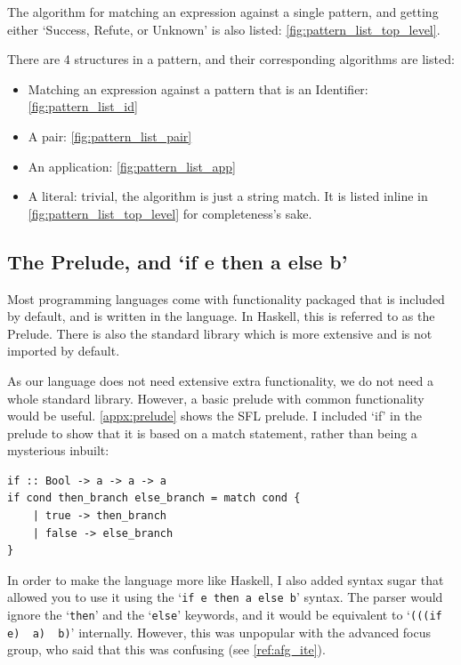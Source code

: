 The algorithm for matching an expression against a single pattern, and getting either `Success, Refute, or Unknown' is also listed: \ref{fig:pattern_list_top_level}. 

There are 4 structures in a pattern, and their corresponding algorithms are listed: 
\begin{itemize}
    \item Matching an expression against a pattern that is an Identifier: \ref{fig:pattern_list_id}
    \item A pair: \ref{fig:pattern_list_pair}
    \item An application: \ref{fig:pattern_list_app}
    \item A literal: trivial, the algorithm is just a string match. It is listed inline in \ref{fig:pattern_list_top_level} for completeness's sake. 
\end{itemize}

\subsection{The Prelude, and `if e then a else b'}
Most programming languages come with functionality packaged that is included by default, and is written in the language. In Haskell, this is referred to as the Prelude. There is also the standard library which is more extensive and is not imported by default. 

As our language does not need extensive extra functionality, we do not need a whole standard library. However, a basic prelude with common functionality would be useful. \ref{appx:prelude} shows the SFL prelude. I included `if' in the prelude to show that it is based on a match statement, rather than being a mysterious inbuilt: 

\begin{lstlisting}[language=SFL]
if :: Bool -> a -> a -> a
if cond then_branch else_branch = match cond {
    | true -> then_branch
    | false -> else_branch
}    
\end{lstlisting}

In order to make the language more like Haskell, I also added syntax sugar that allowed you to use it using the `\lstinline[language=SFL_ite]|if e then a else b|' syntax. The parser would ignore the `\lstinline[language=SFL_ite]|then|' and the `\lstinline[language=SFL_ite]|else|' keywords, and it would be equivalent to `\lstinline[language=SFL_ite]|(((if e)  a)  b)|' internally. However, this was unpopular with the advanced focus group, who said that this was confusing (see \ref{ref:afg_ite}). 

